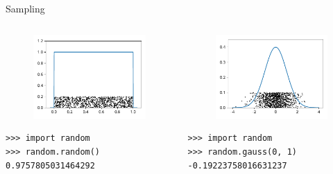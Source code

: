 \documentclass[12pt, aspectratio=149]{beamer}
\theoremstyle{plain}
\begin{document}
\begin{frame}[fragile]{Sampling}
\begin{columns}
\begin{column}{0.5\textwidth}
    \begin{center}
     \begin{figure}
     	\centering
     	\includegraphics[width=0.99\linewidth]{figures/uniform_samples}
     \end{figure}
     \begin{verbatim}
>>> import random
>>> random.random()
0.9757805031464292
     \end{verbatim}
     \end{center}
\end{column}
\begin{column}{0.5\textwidth}  %
    \begin{center}
     \begin{figure}
     	\centering
     	\includegraphics[width=0.99\linewidth]{figures/normal_samples}
     \end{figure}
      \begin{verbatim}
>>> import random
>>> random.gauss(0, 1)
-0.19223758016631237
      \end{verbatim}
     \end{center}
\end{column}
\end{columns}
\end{frame}
\end{document}
